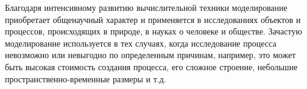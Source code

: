 %
%
%
%
%
%
%
%
%
%
%
%
%
%
%

Благодаря интенсивному развитию вычислительной техники моделирование приобретает общенаучный характер и применяется в исследованиях объектов и процессов, происходящих в природе, в науках о человеке и обществе. Зачастую моделирование используется в тех случаях, когда исследование процесса невозможно или невыгодно по определенным причинам, например, это может быть высокая стоимость создания процесса, его сложное строение, небольшие пространственно-временные размеры и т.д.

